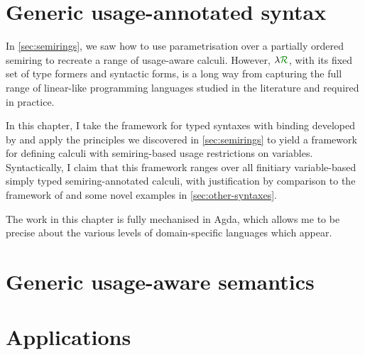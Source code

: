\chapter{Generic usage-annotated syntax}\label{sec:framework}

In \cref{sec:semirings}, we saw how to use parametrisation over a partially
ordered semiring to recreate a range of usage-aware calculi.
However, $\name$, with its fixed set of type formers and syntactic forms, is a
long way from capturing the full range of linear-like programming languages
studied in the literature and required in practice.

In this chapter, I take the framework for typed syntaxes with binding developed
by \citet{AACMM21} and apply the principles we discovered in
\cref{sec:semirings} to yield a framework for defining calculi with
semiring-based usage restrictions on variables.
Syntactically, I claim that this framework ranges over all finitiary
variable-based simply typed semiring-annotated calculi, with justification by
comparison to the framework of \citet{AACMM21} and some novel examples in
\cref{sec:other-syntaxes}.

The work in this chapter is fully mechanised in Agda, which allows me to be
precise about the various levels of domain-specific languages which appear.



\chapter{Generic usage-aware semantics}\label{sec:semantics}



\chapter{Applications}\label{sec:example-semantics}


